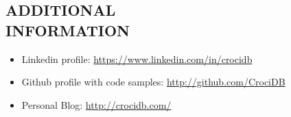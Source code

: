 \documentclass[line,margin]{res}
\begin{document}
\begin{resume}
\section{ADDITIONAL \\ INFORMATION}
        \begin{itemize}  \itemsep 1pt
                \item Linkedin profile: \href{https://www.linkedin.com/in/crocidb}{https://www.linkedin.com/in/crocidb}
                \item Github profile with code samples: \href{http://github.com/CrociDB}{http://github.com/CrociDB}
                \item Personal Blog: \href{http://crocidb.com/}{http://crocidb.com/}
        \end{itemize} 

\end{resume}
\end{document}
